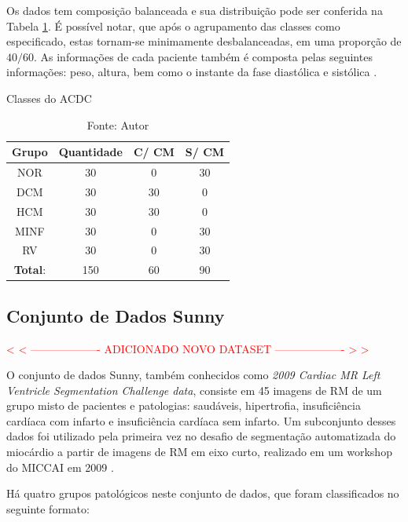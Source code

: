 Os dados tem composição balanceada e sua distribuição pode ser conferida na Tabela \ref{tab:count_dataset}. É possível notar, que após o agrupamento das classes como especificado, estas tornam-se minimamente desbalanceadas, em uma proporção de $40/60$. As informações de cada paciente também é composta pelas seguintes informações: peso, altura, bem como o instante da fase diastólica e sistólica \cite{bernardDeepLearningTechniques2018a}.

\begin{table}[hbtp]
    \centering
    \caption{Classes do ACDC}
    \renewcommand{\arraystretch}{1} %
    \begin{tabular}{|c|c|c|c|}
    \hline 
          \textbf{Grupo} & \textbf{Quantidade} & \textbf{C/ CM} & \textbf{S/ CM}  \\ 
    \hline 
        NOR & 30 & 0 & 30 \\ 
        DCM & 30 & 30 & 0\\ 
        HCM & 30 & 30 & 0\\ 
        MINF & 30 & 0 & 30 \\ 
        RV & 30 & 0 & 30 \\
    \hline 
        \textbf{Total}: & 150  & 60 & 90\\ 
    \hline 
    \end{tabular} 
    \caption*{Fonte: Autor}
    \label{tab:count_dataset}
\end{table}


\subsection{Conjunto de Dados Sunny} 
\label{subsec:cap4_sunny}

\textcolor{red}{
< < ------------------- ADICIONADO NOVO DATASET ------------------- > >
}

O conjunto de dados  Sunny, também conhecidos como \textit{2009 Cardiac MR Left Ventricle Segmentation Challenge data}, consiste em 45 imagens de RM de um grupo misto de pacientes e patologias: saudáveis, hipertrofia, insuficiência cardíaca com infarto e insuficiência cardíaca sem infarto. Um subconjunto desses dados foi utilizado pela primeira vez no desafio de segmentação automatizada do miocárdio a partir de imagens de RM em eixo curto, realizado em um workshop do MICCAI em 2009 \cite{radauEvaluationFrameworkAlgorithms2009}. 

Há quatro grupos patológicos neste conjunto de dados, que foram classificados no seguinte formato:

